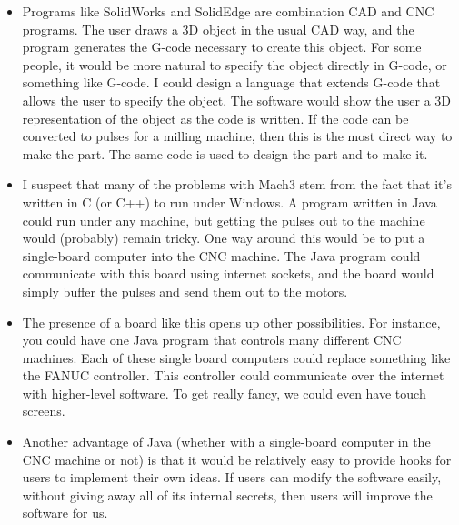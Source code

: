 \documentclass[titlepage,oneside,10pt]{article}
\begin{document}
\begin{itemize}
\item Programs like SolidWorks and SolidEdge are combination CAD and
  CNC programs. The user draws a 3D object in the usual CAD way, and
  the program generates the G-code necessary to create this
  object. For some people, it would be more natural to specify the
  object directly in G-code, or something like G-code. I could design
  a language that extends G-code that allows the user to specify the
  object. The software would show the user a 3D representation of the
  object as the code is written. If the code can be converted to
  pulses for a milling machine, then this is the most direct way to
  make the part. The same code is used to design the part and to make
  it.
\item I suspect that many of the problems with Mach3 stem from the
  fact that it's written in C (or C++) to run under Windows. A program
  written in Java could run under any machine, but getting the pulses
  out to the machine would (probably) remain tricky. One way around
  this would be to put a single-board computer into the CNC
  machine. The Java program could communicate with this board
  using internet sockets, and the board would simply buffer the pulses
  and send them out to the motors.
\item The presence of a board like this opens up other
  possibilities. For instance, you could have one Java program that
  controls many different CNC machines. Each of these single board
  computers could replace something like the FANUC controller. This
  controller could communicate over the internet with higher-level
  software. To get really fancy, we could even have touch screens.
\item Another advantage of Java (whether with a single-board computer
  in the CNC machine or not) is that it would be relatively easy to
  provide hooks for users to implement their own ideas. If users can
  modify the software easily, without giving away all of its internal
  secrets, then users will improve the software for us.
\end{itemize}
\end{document}
